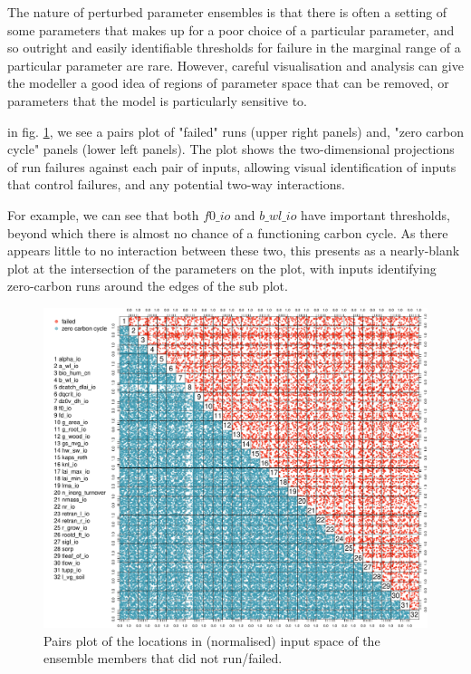 \documentclass[gmd, manuscript]{copernicus}
\begin{document}
The nature of perturbed parameter ensembles is that there is often a setting of some parameters that makes up for a poor choice of a particular parameter, and so outright and easily identifiable thresholds for failure in the marginal range of a particular parameter are rare. However, careful visualisation and analysis can give the modeller a good idea of regions of parameter space that can be removed, or parameters that the model is particularly sensitive to.

in fig. \ref{fig:run-failure-pairs}, we see a pairs plot of "failed" runs (upper right panels) and, "zero carbon cycle" panels (lower left panels). The plot shows the two-dimensional projections of run failures against each pair of inputs, allowing visual identification of inputs that control failures, and any potential two-way interactions.

For example, we can see that both $f0\_io$ and $b\_wl\_io$ have important thresholds, beyond which there is almost no chance of a functioning carbon cycle. As there appears little to no interaction between these two, this presents as a nearly-blank plot at the intersection of the parameters on the plot, with inputs identifying zero-carbon runs around the edges of the sub plot.

\begin{figure}[t]
\includegraphics[width=12cm]{./graphics/run-failure-pairs.pdf}
\caption{Pairs plot of the locations in (normalised) input space of the ensemble members that did not run/failed.}
\label{fig:run-failure-pairs}
\end{figure}
\end{document}
